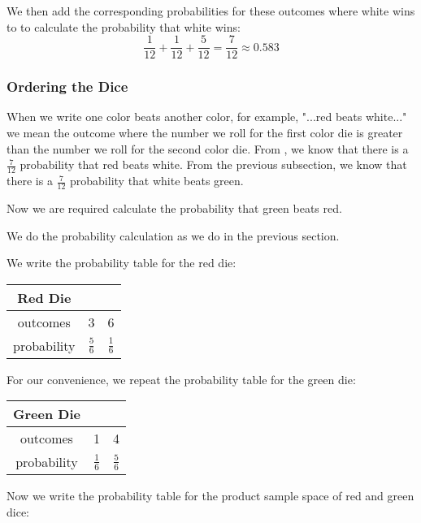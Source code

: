 \documentclass[a4paper,11pt]{article}
\begin{document}
We then add the corresponding probabilities for these outcomes where
white wins to to calculate the probability that white wins:
\begin{equation}
\frac{1}{12} + \frac{1}{12} + \frac{5}{12} = \frac{7}{12} \approx 0.583
\end{equation}

\subsubsection{Ordering the Dice}
When we write one color beats another color, for example, "...red
beats white..." we mean the outcome where the number we roll for the
first color die is greater than the number we roll for the second
color die.
From \cite{classSlides2}, we know that there is a $\frac{7}{12}$
probability that red beats white.
From the previous subsection, we know that there is a $\frac{7}{12}$
probability that white beats green.

Now we are required calculate the probability that green beats red.

We do the probability calculation as we do in the previous section.

We write the probability table for the red die:

\begin{center}
  \begin{tabular}{ | c | c | c |}
    \hline
    Red Die & & \\ \hline
    outcomes & 3 & 6 \\ \hline
    probability & $\frac{5}{6}$ & $\frac{1}{6}$  \\ \hline
  \end{tabular}
\end{center}

For our convenience, we repeat the probability table for the green
die:

\begin{center}
  \begin{tabular}{ | c | c | c |}
    \hline
    Green Die & & \\ \hline
    outcomes & 1 & 4 \\ \hline
    probability & $\frac{1}{6}$ & $\frac{5}{6}$  \\ \hline
  \end{tabular}
\end{center}

Now we write the probability table for the product sample space of 
red and green dice:
\end{document}
